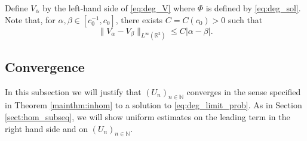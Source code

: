 \documentclass[10pt,a4paper]{article}
\newcommand{\NN}{\mathbb{N}}
\newcommand{\RR}{\mathbb{R}}
\numberwithin{equation}{section}
\begin{document}
Define $ V_{\overline{\alpha}} $ by the left-hand side of \eqref{eq:deg_V} where $ \Phi $ is defined by \eqref{eq:deg_sol}. Note that, for $ \alpha, \beta \in [c_0^{-1}, c_0] $, there exists $C = C(c_0) > 0 $ such that 
\begin{equation}
\label{eq:cont_infty}
	\|V_{\alpha} - V_{\beta}\|_{L^{\infty}(\RR^{2})} \leq C |\alpha - \beta|.
\end{equation}

\subsection{Convergence}

In this subsection we will justify that $ (U_n)_{n\in\NN} $ converges in the sense specified in Theorem \ref{mainthm:inhom} to a solution to \eqref{eq:deg_limit_prob}. As in Section \ref{sect:hom_subseq}, we will show uniform estimates on the leading term in the right hand side and on $ (U_n)_{n\in \NN} $. 
\end{document}
